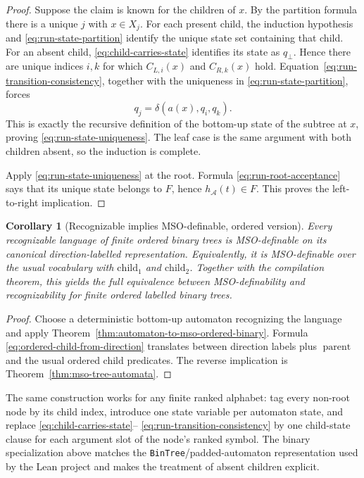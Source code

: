 \documentclass[11pt]{article}
\newtheorem{corollary}[theorem]{Corollary}
\theoremstyle{definition}
\newcommand{\Aut}{\mathcal A}
\newcommand{\child}{\mathrm{child}}
\begin{document}
\begin{proof}
Suppose the claim is known for the children of \(x\).  By the partition
formula there is a unique \(j\) with \(x\in X_j\).  For each present child,
the induction hypothesis and \eqref{eq:run-state-partition} identify the unique
state set containing that child.  For an absent child,
\eqref{eq:child-carries-state} identifies its state as \(q_\bot\).  Hence there
are unique indices \(i,k\) for which \(C_{L,i}(x)\) and \(C_{R,k}(x)\) hold.
Equation~\eqref{eq:run-transition-consistency}, together with the uniqueness in
\eqref{eq:run-state-partition}, forces
\[
  q_j=\delta(a(x),q_i,q_k).
\]
This is exactly the recursive definition of the bottom-up state of the
subtree at \(x\), proving \eqref{eq:run-state-uniqueness}.  The leaf case is the
same argument with both children absent, so the induction is complete.

Apply \eqref{eq:run-state-uniqueness} at the root.  Formula
\eqref{eq:run-root-acceptance} says that its unique state belongs to \(F\),
hence \(h_\Aut(t)\in F\).  This proves the left-to-right implication.
\end{proof}

\begin{corollary}[Recognizable implies MSO-definable, ordered version]
Every recognizable language of finite ordered binary trees is MSO-definable
on its canonical direction-labelled representation.  Equivalently, it is
MSO-definable over the usual vocabulary with \(\child_1\) and \(\child_2\).
Together with the compilation theorem, this yields the full equivalence
between MSO-definability and recognizability for finite ordered labelled
binary trees.
\end{corollary}

\begin{proof}
Choose a deterministic bottom-up automaton recognizing the language and apply
Theorem~\ref{thm:automaton-to-mso-ordered-binary}.  Formula
\eqref{eq:ordered-child-from-direction} translates between direction labels
plus \(\operatorname{parent}\) and the usual ordered child predicates.  The
reverse implication is
Theorem~\ref{thm:mso-tree-automata}.
\end{proof}

The same construction works for any finite ranked alphabet: tag every
non-root node by its child index, introduce one state variable per automaton
state, and replace \eqref{eq:child-carries-state}--
\eqref{eq:run-transition-consistency} by one child-state clause for each
argument slot of the node's ranked symbol.  The binary specialization above matches the
\texttt{BinTree}/padded-automaton representation used by the Lean project and
makes the treatment of absent children explicit.
\end{document}
